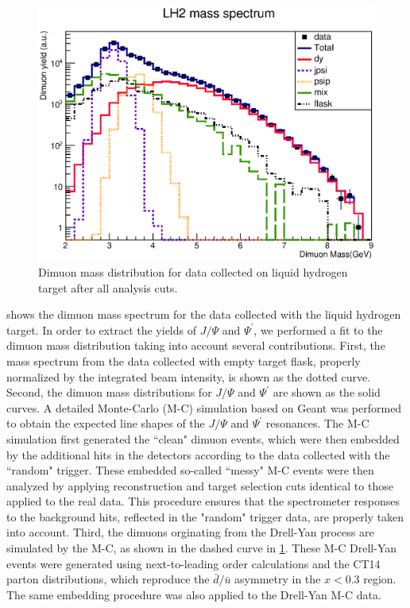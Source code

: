 \documentclass[reprint,aps,unsortedaddress,superscriptaddress,prd,floatfix,showpacs,linenumbers]{revtex4-2}
\begin{document}
\begin{figure}
	\includegraphics[width=\linewidth]{massFit/LH2_massfit}
	\caption{Dimuon mass distribution for data collected on liquid hydrogen target
		after all analysis cuts.}
	\label{fig:massfit_LH2}
\end{figure}
 shows the dimuon mass spectrum for the data collected with the
liquid hydrogen target. In order to extract the yields of $J/\Psi$ and
$\Psi^\prime$, we performed a fit to the dimuon mass distribution taking
into account several contributions. First, the mass spectrum from the
data collected with empty target flask, properly normalized by the
integrated beam intensity, is shown as the dotted curve. Second, the
dimuon mass distributions for $J/\Psi$ and $\Psi^\prime$ are shown as
the solid curves. A detailed Monte-Carlo (M-C) simulation based on Geant was
performed to obtain the expected line shapes of the $J/\Psi$ and $\Psi^\prime$
resonances. The M-C simulation first generated the ``clean" dimuon events,
which were then embedded by the additional hits in the detectors according to
the data collected with the ``random" trigger. These embedded
so-called ``messy" M-C events were then analyzed by applying reconstruction
and target selection cuts identical to those applied to the real data. This
procedure ensures that the spectrometer responses to the background hits,
reflected in the "random" trigger data, are properly taken into account.
Third, the dimuons orginating from the Drell-Yan process are simulated
by the M-C, as shown in the dashed curve in \cref{fig:massfit_LH2}. These M-C
Drell-Yan events were generated using next-to-leading order
calculations and the CT14 parton distributions,
which reproduce the $\bar{d}/ \bar{u}$ asymmetry in the $x < 0.3$ region.
The same embedding procedure was also applied to the Drell-Yan M-C data.
\end{document}
